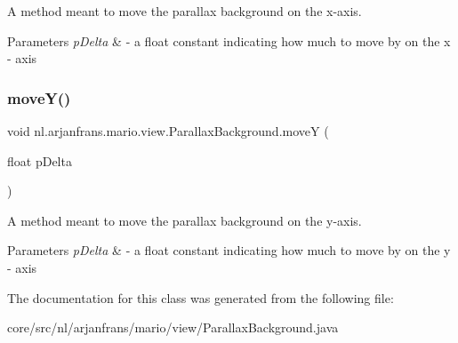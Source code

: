 A method meant to move the parallax background on the x-\/axis. 


\begin{DoxyParams}{Parameters}
{\em p\+Delta} & -\/ a float constant indicating how much to move by on the x -\/ axis \\
\hline
\end{DoxyParams}
\mbox{\label{classnl_1_1arjanfrans_1_1mario_1_1view_1_1ParallaxBackground_a626301d2f854e2876a93f0df64e4b533}} 
\subsubsection{\texorpdfstring{move\+Y()}{moveY()}}
{\footnotesize\ttfamily void nl.\+arjanfrans.\+mario.\+view.\+Parallax\+Background.\+moveY (\begin{DoxyParamCaption}\item[{float}]{p\+Delta }\end{DoxyParamCaption})}



A method meant to move the parallax background on the y-\/axis. 


\begin{DoxyParams}{Parameters}
{\em p\+Delta} & -\/ a float constant indicating how much to move by on the y -\/ axis \\
\hline
\end{DoxyParams}


The documentation for this class was generated from the following file\+:\begin{DoxyCompactItemize}
\item 
core/src/nl/arjanfrans/mario/view/Parallax\+Background.\+java\end{DoxyCompactItemize}
